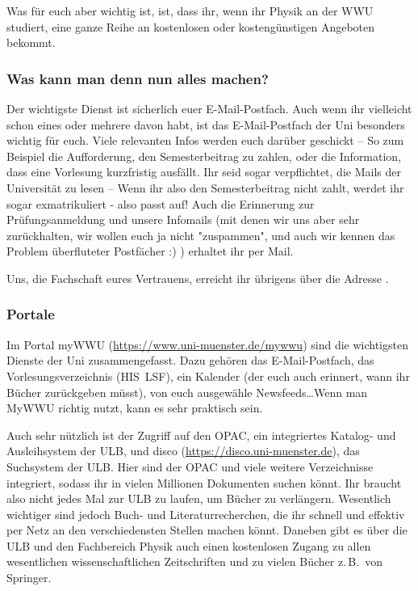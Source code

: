 \begin{multicols}{2}
Was für euch aber wichtig ist, ist, dass ihr, wenn ihr Physik an der WWU studiert, eine ganze Reihe an kostenlosen oder kostengünstigen Angeboten bekommt.

\subsubsection*{Was kann man denn nun alles machen?}
Der wichtigste Dienst ist sicherlich euer E-Mail-Postfach. Auch wenn ihr vielleicht schon eines oder mehrere davon habt, ist das E-Mail-Postfach der Uni besonders wichtig für euch. Viele relevanten Infos werden euch darüber geschickt -- So zum Beispiel die Aufforderung, den Semesterbeitrag zu zahlen, oder die Information, dass eine Vorlesung kurzfristig ausfällt. Ihr seid sogar verpflichtet, die Mails der Universität zu lesen -- Wenn ihr also den Semesterbeitrag nicht zahlt, werdet ihr sogar exmatrikuliert - also passt auf! Auch die Erinnerung zur Prüfungsanmeldung und unsere Infomails (mit denen wir uns aber sehr zurückhalten, wir wollen euch ja nicht "zuspammen", und auch wir kennen das Problem überfluteter Postfächer :) ) erhaltet ihr per Mail.

Uns, die Fachschaft eures Vertrauens, erreicht ihr übrigens über die Adresse .

\subsubsection*{Portale}
Im Portal myWWU (\url{https://www.uni-muenster.de/mywwu}) sind die wichtigsten Dienste der Uni zusammengefasst. Dazu gehören das E-Mail-Postfach, das Vorlesungsverzeichnis (HIS~LSF), ein Kalender (der euch auch erinnert, wann ihr Bücher zurückgeben müsst), von euch ausgewähle Newsfeeds\dots Wenn man MyWWU richtig nutzt, kann es sehr praktisch sein.

Auch sehr nützlich ist der Zugriff auf den OPAC, ein integriertes Katalog- und Ausleihsystem der ULB, und disco (\url{https://disco.uni-muenster.de}), das Suchsystem der ULB. Hier sind der OPAC und viele weitere Verzeichnisse integriert, sodass ihr in vielen Millionen Dokumenten suchen könnt. Ihr braucht also nicht jedes Mal zur ULB zu laufen, um Bücher zu verlängern. Wesentlich wichtiger sind jedoch Buch- und Literaturrecherchen, die ihr schnell und effektiv per Netz an den verschiedensten Stellen machen könnt. Daneben gibt es über die ULB und den Fachbereich Physik auch einen kostenlosen Zugang zu allen wesentlichen wissenschaftlichen Zeitschriften und zu vielen Bücher z.\,B.\ von Springer.


\end{multicols}
